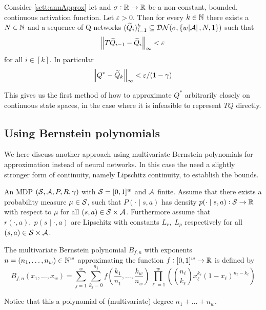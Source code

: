 \begin{prop}
  Consider \cref{sett:annApprox} let
  and $\sigma : \mathbb{R} \to \mathbb{R}$ be a non-constant, bounded, continuous
  activation function. Let $\varepsilon > 0$.
  Then for every $k \in \mathbb{N}$ there exists a $N\in \mathbb{N}$ and a sequence of
  Q-networks $(\widetilde{Q}_i)_{i=1}^k \subseteq \mathcal{DN}(\sigma,
  \{w \abs{\mathcal{A}}, N, 1\})$ such that
  \[ \norm{T\widetilde{Q}_{i-1} - \widetilde{Q}_i}_\infty < \varepsilon \]
  for all $i \in [k]$.
  In particular
  \[ \norm{Q^* - \widetilde{Q}_k}_\infty < \varepsilon/(1 - \gamma) \]
\end{prop}

This gives us the first method of how to approximate
$Q^*$ arbitrarily closely on continuous state spaces, in the case
where it is infeasible to represent $TQ$ directly.

\subsection{Using Bernstein polynomials}

We here discuss another approach using multivariate Bernstein polynomials
for approximation instead of neural networks.
In this case the need a slightly stronger form of continuity, namely
Lipschitz continuity, to establish the bounds.

\begin{sett}
  An MDP $(\mathcal{S}, \mathcal{A}, P, R, \gamma)$ with
  $\mathcal{S} = [0,1]^w$ and $\mathcal{A}$ finite.
  Assume that there exists a probability measure $\mu \in \mathcal{S}$, such that
  $P(\cdot \mid s, a)$ has density
  $p(\cdot \mid s, a) : \mathcal{S} \to \mathbb{R}$ with respect to
  $\mu$ for all $(s, a) \in \mathcal{S}\times\mathcal{A}$. 
  Furthermore assume that $r(\cdot, a), \; p(s \mid \cdot, a)$ are
  Lipschitz
  with constants $L_r,\; L_p$ respectively for all
  $(s, a) \in \mathcal{S} \times \mathcal{A}$.
  \label{sett:polyApprox}
\end{sett}

\begin{defn}
  The multivariate Bernstein polynomial $B_{f, n}$ with exponents
  $n=(n_1, \dots, n_w) \in \mathbb{N}^w$ approximating the function $f:[0,1]^w \to \mathbb{R}$
  is defined by
  \begin{equation*}
    B_{f, n}(x_1, \dots, x_w) =
    \sum_{j = 1}^w \sum_{k_j = 0}^{n_j}
    f\left( \frac{k_1}{n_1}, \dots, \frac{k_w}{n_w} \right)
    \prod_{\ell = 1}^w \left(
    \binom{n_\ell}{k_\ell} x_\ell^{k_\ell}(1-x_\ell)^{n_\ell - k_\ell} \right)
  \end{equation*}
  \label{defn:Bfn}
\end{defn}
Notice that this a polynomial of (multivariate) degree $n_1 + \dots + n_w$.

